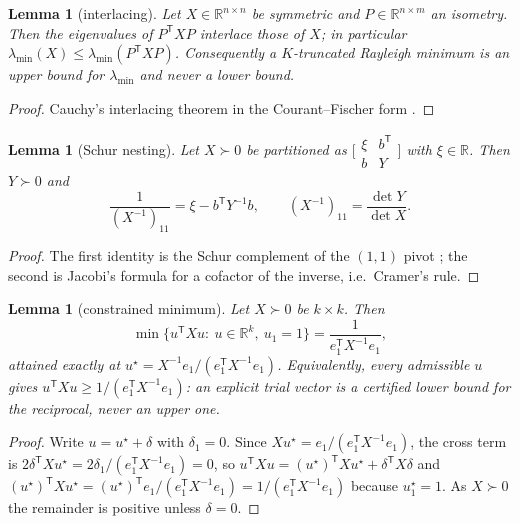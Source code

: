\documentclass[11pt,a4paper]{article}
\theoremstyle{plain}
\newtheorem{lemma}[theorem]{Lemma}
\theoremstyle{definition}
\newcommand{\R}{\mathbb{R}}
\newcommand{\T}{\mathsf{T}}
\newcommand{\lmin}{\lambda_{\min}}
\newcommand{\PD}{\succ 0}
\begin{document}
\begin{lemma}[interlacing]
\label{lem:interlacing}
Let $X\in\R^{n\times n}$ be symmetric and $P\in\R^{n\times m}$ an isometry.
Then the eigenvalues of $P^{\T}XP$ interlace those of $X$; in particular
$\lmin(X)\le\lmin(P^{\T}XP)$. Consequently a $K$-truncated Rayleigh minimum is
an upper bound for $\lmin$ and never a lower bound.
\end{lemma}

\begin{proof}
Cauchy's interlacing theorem \cite{Cauchy1829} in the Courant--Fischer form
\cite{CourantFischer1920}.
\end{proof}

\begin{lemma}[Schur nesting]
\label{lem:nesting}
Let $X\PD$ be partitioned as
$\bigl[\begin{smallmatrix}\xi&b^{\T}\\ b&Y\end{smallmatrix}\bigr]$ with
$\xi\in\R$. Then $Y\PD$ and
\begin{equation}
\label{eq:schur}
  \frac1{(X^{-1})_{11}}=\xi-b^{\T}Y^{-1}b,
  \qquad
  (X^{-1})_{11}=\frac{\det Y}{\det X} .
\end{equation}
\end{lemma}

\begin{proof}
The first identity is the Schur complement of the $(1,1)$ pivot
\cite{Schur1917,Haynsworth1968}; the second is Jacobi's formula for a cofactor
of the inverse, i.e.\ Cramer's rule.
\end{proof}

\begin{lemma}[constrained minimum]
\label{lem:constrained}
Let $X\PD$ be $k\times k$. Then
\begin{equation}
\label{eq:constrmin}
  \min\{u^{\T}Xu:\ u\in\R^{k},\ u_1=1\}
  =\frac1{e_1^{\T}X^{-1}e_1},
\end{equation}
attained exactly at $u^{\star}=X^{-1}e_1/(e_1^{\T}X^{-1}e_1)$. Equivalently,
\emph{every} admissible $u$ gives $u^{\T}Xu\ge1/(e_1^{\T}X^{-1}e_1)$: an
explicit trial vector is a certified lower bound for the reciprocal, never an
upper one.
\end{lemma}

\begin{proof}
Write $u=u^{\star}+\delta$ with $\delta_1=0$. Since
$Xu^{\star}=e_1/(e_1^{\T}X^{-1}e_1)$, the cross term is
$2\delta^{\T}Xu^{\star}=2\delta_1/(e_1^{\T}X^{-1}e_1)=0$, so
$u^{\T}Xu=(u^{\star})^{\T}Xu^{\star}+\delta^{\T}X\delta$ and
$(u^{\star})^{\T}Xu^{\star}=(u^{\star})^{\T}e_1/(e_1^{\T}X^{-1}e_1)
=1/(e_1^{\T}X^{-1}e_1)$ because $u^{\star}_1=1$. As $X\PD$ the remainder is
positive unless $\delta=0$.
\end{proof}
\end{document}
